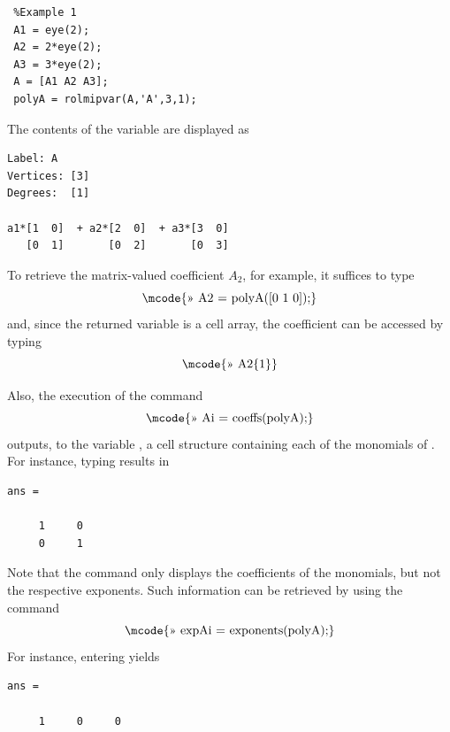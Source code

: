 \documentclass[english,11pt]{article}
\newcommand\vi{\vspace{.5cm}}
\theoremstyle{break} \theorembodyfont{\small\rm}
\begin{document}
\begin{minipage}{8.5cm}
\begin{lstlisting}
 %Example 1
 A1 = eye(2);
 A2 = 2*eye(2);
 A3 = 3*eye(2);
 A = [A1 A2 A3];
 polyA = rolmipvar(A,'A',3,1);
\end{lstlisting}
\end{minipage}

\vi
The contents of the  variable  are displayed as

\begin{minipage}{8.5cm}
\begin{lstlisting}[rulecolor=\color{red}]
Label: A
Vertices: [3]
Degrees:  [1]
 
a1*[1  0]  + a2*[2  0]  + a3*[3  0] 
   [0  1]       [0  2]       [0  3]
\end{lstlisting}
\end{minipage}
\vi

To retrieve the matrix-valued coefficient $A_2$, for example, it suffices to type
\[
\mbox{\mcode{>> A2 = polyA([0 1 0]);}}
\]
and, since the returned variable is a cell array, the coefficient can be accessed by typing
\[
\mbox{\mcode{>> A2\{1\}}}
\]

Also, the execution of the command
\[
\mbox{\mcode{>> Ai = coeffs(polyA);}}
\]
outputs, to the variable , a cell structure containing each of the monomials of . For instance,
typing  results in

\begin{minipage}{3.5cm}
\begin{lstlisting}[rulecolor=\color{red}]
ans =

     1     0
     0     1
\end{lstlisting}
\end{minipage}

Note that the command  only displays the coefficients of the monomials, but not the respective exponents.
Such information can be retrieved by using the command 
\[
\mbox{\mcode{>> expAi = exponents(polyA);}}
\]
For instance, entering  yields 

\begin{minipage}{5.5cm}
\begin{lstlisting}[rulecolor=\color{red}]
ans =

     1     0     0
\end{lstlisting}
\end{minipage}
\end{document}

